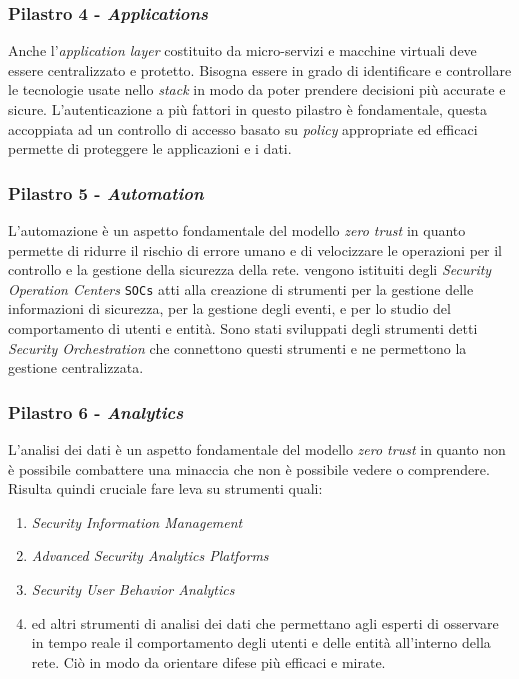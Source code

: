         \subsubsection{Pilastro 4 - \textit{Applications}}
            Anche l'\textit{application layer} costituito da micro-servizi e macchine virtuali deve essere centralizzato e protetto. Bisogna essere in grado di identificare e controllare le tecnologie usate nello \textit{stack} in modo da poter prendere decisioni più accurate e sicure.\newline
            L'autenticazione a più fattori in questo pilastro è fondamentale, questa accoppiata ad un controllo di accesso basato su \textit{policy} appropriate ed efficaci permette di proteggere le applicazioni e i dati.
        \subsubsection{Pilastro 5 - \textit{Automation}}
            L'automazione è un aspetto fondamentale del modello \textit{zero trust} in quanto permette di ridurre il rischio di errore umano e di velocizzare le operazioni per il controllo e la gestione della sicurezza della rete.\newline
            vengono istituiti degli \textit{Security Operation Centers} \texttt{SOCs} atti alla creazione di strumenti per la gestione delle informazioni di sicurezza, per la gestione degli eventi, e per lo studio del comportamento di utenti e entità. Sono stati sviluppati degli strumenti detti \textit{Security Orchestration} che connettono questi strumenti e ne permettono la gestione centralizzata.
        \subsubsection{Pilastro 6 - \textit{Analytics}}
            L'analisi dei dati è un aspetto fondamentale del modello \textit{zero trust} in quanto non è possibile combattere una minaccia che non è possibile vedere o comprendere. Risulta quindi cruciale fare leva su strumenti quali: \begin{enumerate}
                \item \textit{Security Information Management} 
                \item \textit{Advanced Security Analytics Platforms}
                \item \textit{Security User Behavior Analytics}
                \item ed altri strumenti di analisi dei dati che permettano agli esperti di osservare in tempo reale il comportamento degli utenti e delle entità all'interno della rete. Ciò in modo da orientare difese più efficaci e mirate.
            \end{enumerate}
